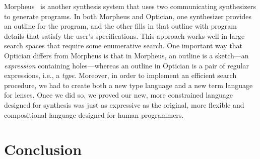 \documentclass[acmsmall,review,anonymous]{acmart}
\begin{document}
Morpheus~\cite{morpheus} is another synthesis system that uses two
communicating synthesizers to generate programs.  In both Morpheus and
Optician, one synthesizer provides an
outline for the program, and the other fills in that outline with program
details that satisfy the user's specifications.
This approach works well in large search spaces that require some enumerative
search.
One important way that Optician differs from Morpheus is that in
Morpheus, an outline is a sketch---an
\emph{expression}
containing holes---whereas
an outline in Optician is a pair of regular
expressions, i.e., a
\emph{type}.  Moreover, in order to implement an efficient
search procedure, we had to create both a new type language and a new
term language for lenses.  Once we did so, we proved our new, more
constrained language
designed for synthesis was just as expressive as the original, more
flexible and compositional language designed for human programmers.


\section{Conclusion}
\label{concl}



\end{document}
